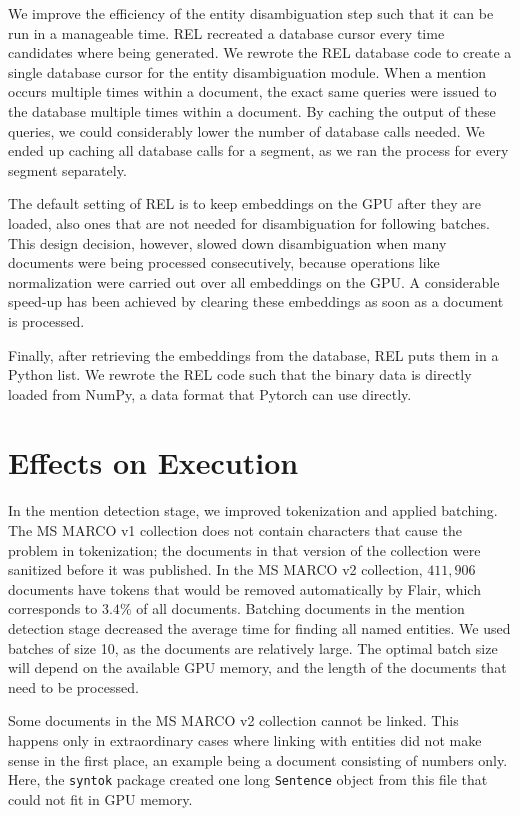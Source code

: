 We improve the efficiency of the entity disambiguation step such that it can be run in a manageable time. REL recreated a database cursor every time candidates where being generated. We rewrote the REL database code to create a single database cursor for the entity disambiguation module. 
When a mention occurs multiple times within a document, the exact same queries were issued to the database multiple times within a document.  By caching the output of these queries, we could considerably lower the number of database calls needed. We ended up caching all database calls for a segment, as we ran the process for every segment separately. 

The default setting of REL is to keep embeddings on the GPU after they are loaded, also ones that are not needed for disambiguation for following batches.
This design decision, however, slowed down disambiguation when many documents were being processed consecutively, because operations like normalization were carried out over all embeddings on the GPU. 
A considerable speed-up has been achieved by clearing these embeddings as soon as a document is processed.

Finally, after retrieving the embeddings from the database, REL puts them in a Python list. We rewrote the REL code such that the binary data is directly loaded from NumPy, a data format that Pytorch can use directly. 

\section{Effects on Execution}
In the mention detection stage, we improved tokenization and applied batching. The MS MARCO v1 collection does not contain characters that cause the problem in tokenization; the documents in that version of the collection were sanitized before it was published. In the MS MARCO v2 collection, $411,906$ documents have tokens that would be removed automatically by Flair, which corresponds to $3.4\%$ of all documents.
Batching documents in the mention detection stage decreased the average time for finding all named entities. We used batches of size 10, as the documents are relatively large. The optimal batch size will depend on the available GPU memory, and the length of the documents that need to be processed.

Some documents in the MS MARCO v2 collection cannot be linked. This happens only in extraordinary cases where linking with entities did not make sense in the first place, an example being a document consisting of numbers only. Here, the \texttt{syntok} package created one long \texttt{Sentence} object from this file that could not fit in GPU memory.

